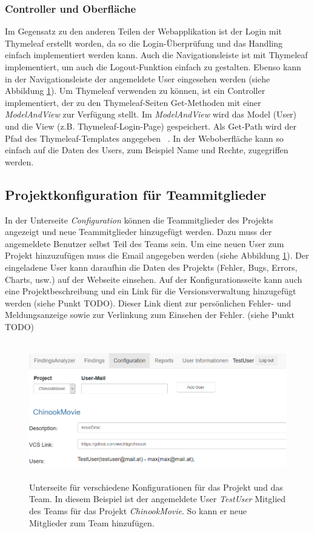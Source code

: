 \subsubsection{Controller und Oberfläche} 
Im Gegensatz zu den anderen Teilen der Webapplikation ist der Login mit Thymeleaf erstellt worden, da so die Login-Überprüfung und das Handling einfach implementiert werden kann. Auch die Navigationsleiste ist mit Thymeleaf implementiert, um auch die Logout-Funktion einfach zu gestalten. Ebenso kann in der Navigationsleiste der angemeldete User eingesehen werden (siehe Abbildung \ref{fig:configuration}). Um Thymeleaf verwenden zu können, ist ein Controller implementiert, der zu den Thymeleaf-Seiten Get-Methoden mit einer \textit{ModelAndView} zur Verfügung stellt. Im \textit{ModelAndView} wird das Model (User) und die View (z.B. Thymeleaf-Login-Page) gespeichert. Als Get-Path wird der Pfad des Thymeleaf-Templates angegeben ~\parencite[Seite 160]{springSecBook}. In der Weboberfläche kann so einfach auf die Daten des Users, zum Beispiel Name und Rechte, zugegriffen werden.
\subsection{Projektkonfiguration für Teammitglieder}
In der Unterseite \textit{Configuration} können die Teammitglieder des Projekts angezeigt und neue Teammitglieder hinzugefügt werden. Dazu muss der angemeldete Benutzer selbst Teil des Teams sein. Um eine neuen User zum Projekt hinzuzufügen muss die Email angegeben werden (siehe Abbildung \ref{fig:configuration}). Der eingeladene User kann daraufhin die Daten des Projekts (Fehler, Bugs, Errors, Charts, usw.) auf der Webseite einsehen. Auf der Konfigurationsseite kann auch eine Projektbeschreibung und ein Link für die Versionsverwaltung hinzugefügt werden (siehe Punkt TODO). Dieser Link dient zur persönlichen Fehler- und Meldungsanzeige sowie zur Verlinkung zum Einsehen der Fehler. (siehe Punkt TODO)
\begin{figure}[tp]
  \centering
  \includegraphics[height=6cm]{images/configuration.PNG}
 \caption[Konfiguration für das Projekt und Team]{Unterseite für verschiedene Konfigurationen für das Projekt und das Team. In diesem Beispiel ist der angemeldete User \textit{TestUser} Mitglied des Teams für das Projekt \textit{ChinookMovie}. So kann er neue Mitglieder zum Team hinzufügen.}
  \label{fig:configuration}
\end{figure}
